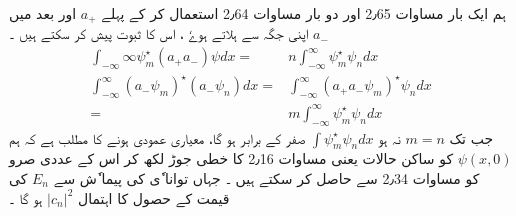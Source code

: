ہم ایک بار مساوات 2٫65 اور دو بار مساوات 2٫64 استعمال کر کے  پہلے 
$ a_+ $
اور بعد میں 
$ a_-  $
اپنی جگہ سے ہلاتے ہوےٗ ، اس کا ثبوت پیش کر سکتے ہیں ۔
\begin{align}
\int_{ - \infty }{ \infty } \psi_m^\star(a_+ a_- )\psi dx =& n \int_{ - \infty }^{ \infty } \psi_m^\star \psi_n dx
\\
\int_{ - \infty }^{ \infty } ( a_- \psi_m  )^\star( a_- \psi_n ) dx =& \int_{ - \infty }^{ \infty } ( a_+ a_- \psi_m)^\star \psi_n dx
\\
=& m \int_{ - \infty }^{ \infty } \psi_m^\star \psi_n dx
\end{align}
جب تک 
$ m = n $
نہ ہو 
$ \int \psi_m^\star \psi_n dx  $
 صفر کے برابر ہو گا، معیاری عمودی ہونے کا مطلب  ہے کہ ہم 
$ \psi ( x , 0 ) $
کو  ساکن حالات یعنی  مساوات 2٫16 کا خطی جوڑ لکھ کر اس کے عددی صرو کو مساوات 2٫34 سے حاصل کر سکتے ہیں ۔ جہاں توانا ٗی کی پیما ٗش سے 
$ E_n $
کی قیمت کے حصول کا اہتمال 
$ | c_n |^2 $
ہو گا ۔
 



